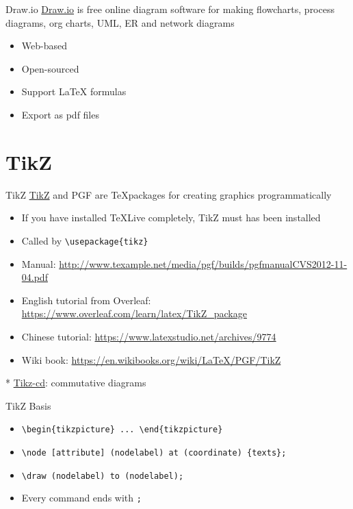 \documentclass{../TexTemplate/myslide}
\begin{document}
\begin{frame}{Draw.io}
\href{https://www.draw.io/}{Draw.io} is free online diagram software for making flowcharts, process diagrams, org charts, UML, ER and network diagrams
\begin{itemize}
	\item Web-based
	\item Open-sourced
	\item Support \LaTeX{} formulas
	\item Export as pdf files
\end{itemize}
\end{frame}

\section{TikZ}
\begin{frame}
\sectionpage
\end{frame}

\begin{frame}[fragile]{TikZ}
\href{http://www.texample.net/tikz/}{TikZ} and PGF are \TeX packages for creating graphics programmatically
\begin{itemize}
	\item If you have installed TeXLive completely, TikZ must has been installed
	\item Called by \verb'\usepackage{tikz}'
	\item Manual: \url{http://www.texample.net/media/pgf/builds/pgfmanualCVS2012-11-04.pdf}
	\item English tutorial from Overleaf: \url{https://www.overleaf.com/learn/latex/TikZ_package}
	\item Chinese tutorial: \url{https://www.latexstudio.net/archives/9774}
	\item Wiki book: \url{https://en.wikibooks.org/wiki/LaTeX/PGF/TikZ}
\end{itemize}
* \href{http://ctan.math.washington.edu/tex-archive/graphics/pgf/contrib/tikz-cd/tikz-cd-doc.pdf}{Tikz-cd}: commutative diagrams
\end{frame}

\begin{frame}[fragile]{TikZ Basis}
\begin{itemize}
	\item \verb'\begin{tikzpicture} ... \end{tikzpicture}'
	\item \verb'\node [attribute] (nodelabel) at (coordinate) {texts};'
	\item \verb'\draw (nodelabel) to (nodelabel);'
	\item Every command ends with \verb';'
\end{itemize}
\end{frame}
\end{document}
